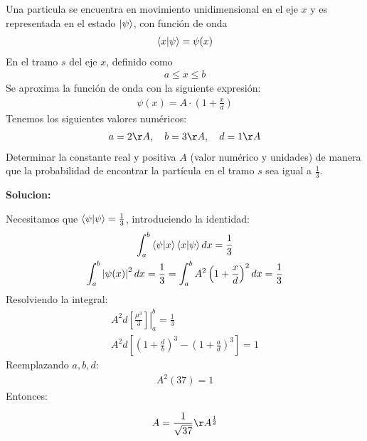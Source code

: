 \documentclass{article}
\newcommand{\caja}[3]{%
  \begin{tcolorbox}[colback=#1!5!white,colframe=#1!25!black,title=#2]
    #3
  \end{tcolorbox}%
}
\begin{document}

\section{}

Una particula se encuentra en movimiento unidimensional en el eje $ x  $ y es representada en el estado $ \ket{\psi} $, con función de onda
\begin{gather*}
  \bra{x }\ket{\psi} = \psi(x) 
\end{gather*}
En el tramo $ s  $ del eje $ x  $, definido como 
\begin{gather*}
  a \leq x \leq b  
\end{gather*}
Se aproxima la función de onda con la siguiente expresión: 
\begin{gather*}
  \psi(x) =  A \cdot (1+ \frac{x }{d }) 
\end{gather*}
Tenemos los siguientes valores numéricos: 
\begin{gather*}
  a = 2 \AA, \quad b = 3 \AA, \quad d = 1 \AA
\end{gather*}
Determinar la constante real y positiva $ A  $ (valor numérico y unidades) de manera que la probabilidad de encontrar la partícula en el tramo $ s  $ sea igual a $ \frac{1}{3 } $.

\textbf{Solucion: }

Necesitamos que $ \bra{\psi}\ket{\psi} = \frac{1}{3}  $, introduciendo la identidad: 
\begin{gather*}
  \displaystyle\int_{a }^{b } \bra{\psi}\ket{x }\bra{x }\ket{\psi}dx = \frac{1}{3}\\
  \displaystyle\int_{a }^{b } \left|\psi(x) \right|^2 dx = \frac{1}{3 } = \displaystyle\int_{a }^{b } A^2 \left(1 + \frac{x }{d }\right)^2 dx = \frac{1}{3}
\end{gather*}
Resolviendo la integral: 
\begin{gather*}
  \left. A^2 d \left[\frac{\mu^3 }{3 }\right]\right|_a^b = \frac{1}{3}\\
  A^2d \left[\left(1 + \frac{d }{b }\right)^3 - \left(1 + \frac{a }{d }\right)^3 \right] = 1
\end{gather*}
Reemplazando $ a,b,d  $: 
\begin{gather*}
  A^2 \left(37 \right) = 1
\end{gather*}
Entonces: 
\caja{red}{}{
  \begin{gather*}
    A = \frac{1}{\sqrt{37 } }\AA ^ {\frac{1}{2}} 
  \end{gather*}
}
\end{document}
